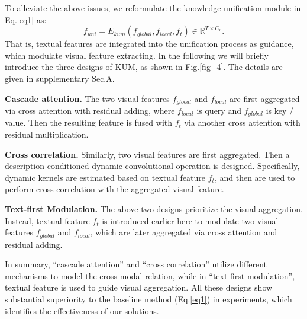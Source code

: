 \documentclass[10pt,twocolumn,letterpaper]{article}
\begin{document}
    To alleviate the above issues, we reformulate the knowledge unification module in Eq.\ref{eq1} as:
    \begin{equation}
        f_{uni} = E_{kum}(f_{global}, f_{local}, f_t) \in \mathbb R^{T \times C_v}. \label{eq2}
    \end{equation}
    That is, textual features are integrated into the unification process as guidance, which modulate visual feature extracting.
    In the following we will briefly introduce the three designs of KUM, as shown in Fig.\ref{fig_4}.
    The details are given in supplementary Sec.A.

    \noindent \textbf{Cascade attention.}
    The two visual features $f_{global}$ and $f_{local}$ are first aggregated via cross attention \cite{vaswani2017attention} with residual adding,
    where $f_{local}$ is query and $f_{global}$ is key / value.
    Then the resulting feature is fused with $f_t$ via another cross attention with residual multiplication.

    \noindent \textbf{Cross correlation.}
    Similarly, two visual features are first aggregated.
    Then a description conditioned dynamic convolutional operation is designed.
    Specifically, dynamic kernels are estimated based on textual feature $f_t$, and then are used to perform cross correlation with the aggregated visual feature.

    \noindent \textbf{Text-first Modulation.}
    The above two designs prioritize the visual aggregation.
    Instead, textual feature $f_t$ is introduced earlier here to modulate two visual features $f_{global}$ and $f_{local}$,
    which are later aggregated via cross attention and residual adding.

    In summary, ``cascade attention'' and ``cross correlation'' utilize different mechanisms to model the cross-modal relation,
    while in ``text-first modulation'', textual feature is used to guide visual aggregation.
    All these designs show substantial superiority to the baseline method (Eq.\ref{eq1}) in experiments, 
    which identifies the effectiveness of our solutions.

\end{document}
